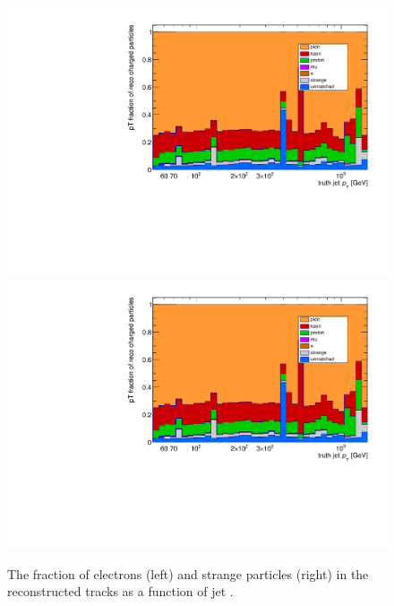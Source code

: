 \begin{figure}
\centering
\includegraphics[scale=0.3, page=8]{figures/jet_comp_study_powheg_Tight_pTFraction.pdf}
\includegraphics[scale=0.3, page=9]{figures/jet_comp_study_powheg_Tight_pTFraction.pdf}
\caption {The fraction of electrons (left) and strange particles (right) in the reconstructed tracks as a function of jet \pT.}
\label{fig:response electrons and starnge particles}
\end{figure}

\clearpage
